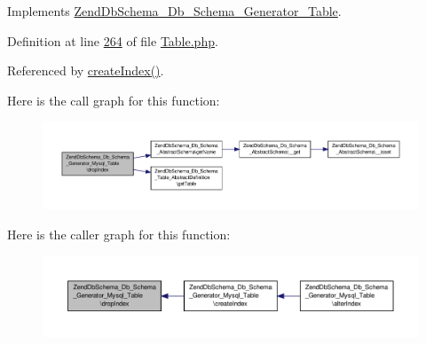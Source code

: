 Implements \hyperlink{interfaceZendDbSchema__Db__Schema__Generator__Table_a0a533a12039bfdd7e6a10f5a639463c7}{Zend\-Db\-Schema\-\_\-\-Db\-\_\-\-Schema\-\_\-\-Generator\-\_\-\-Table}.



Definition at line \hyperlink{Generator_2Mysql_2Table_8php_source_l00264}{264} of file \hyperlink{Generator_2Mysql_2Table_8php_source}{Table.\-php}.



Referenced by \hyperlink{Generator_2Mysql_2Table_8php_source_l00227}{create\-Index()}.



Here is the call graph for this function\-:\nopagebreak
\begin{figure}[H]
\begin{center}
\leavevmode
\includegraphics[width=350pt]{classZendDbSchema__Db__Schema__Generator__Mysql__Table_acb80829a10a192635417efba5b9d5439_cgraph}
\end{center}
\end{figure}




Here is the caller graph for this function\-:\nopagebreak
\begin{figure}[H]
\begin{center}
\leavevmode
\includegraphics[width=350pt]{classZendDbSchema__Db__Schema__Generator__Mysql__Table_acb80829a10a192635417efba5b9d5439_icgraph}
\end{center}
\end{figure}


